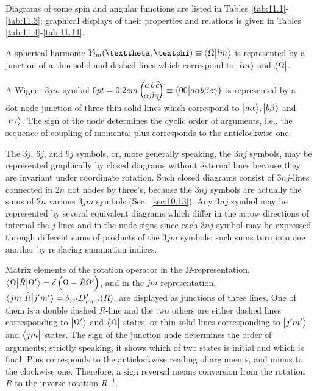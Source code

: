 Diagrams of some spin and angular functions are listed in Tables \ref{tab:11.1}-\ref{tab:11.3}; graphical displays of their properties and relations is given in Tables \ref{tab:11.4}-\ref{tab:11.14}.

A spherical harmonic \(Y_{l m}(\vartheta, \varphi) \equiv\braket{\Omega}{l m}\) is represented by a junction of a thin solid and dashed lines which correspond to \(\bigl| l m \bigr\rangle\) and \(\bigl\langle \Omega \bigr|\).

A Wigner \(3 j m\) symbol \(\threej{a}{b}{c}{\alpha}{\beta}{\gamma} \equiv\rbraket{00}{a \alpha b \beta c \gamma}\) is represented by a dot-node junction of three thin solid lines which correspond to \(\bigl| a \alpha \bigr\rangle, \bigl| b \beta \bigr\rangle\) and \(\bigl| c \gamma \bigr\rangle\). The sign of the node determines the cyclic order of arguments, i.e., the sequence of coupling of momenta: plus corresponds to the anticlockwise one.

The \(3 j\), \(6 j\), and \(9 j\) symbols, or, more generally speaking, the \(3 n j\) symbols, may be represented graphically by closed diagrams without external lines because they are invariant under coordinate rotation. Such closed diagrams consist of \(3 n j\)-lines connected in \(2 n\) dot nodes by three's, because the \(3 n j\) symbols are actually the sums of \(2 n\) various \(3 j m\) symbols (Sec.~\ref{sec:10.13}). Any \(3 n j\) symbol may be represented by several equivalent diagrams which differ in the arrow directions of internal the \(j\) lines and in the node signs since each \(3 n j\) symbol may be expressed through different sums of products of the \(3 jm\) symbols; such sums turn into one another by replacing summation indices.

Matrix elements of the rotation operator in the \(\Omega\)-representation, \(\bigl\langle \Omega \big| \hat{R} \big| \Omega^{\prime} \bigr\rangle=\delta\left(\Omega-\hat{R} \Omega^{\prime}\right)\), and in the \(j m\) representation, \(\bigl\langle j m \big| \widehat{R} \big| j^{\prime} m^{\prime} \bigr\rangle=\delta_{j j^{\prime}} D_{m m^{\prime}}^{j}(R)\), are displayed as junctions of three lines. One of them is a double dashed \(R\)-line and the two others are either dashed lines corresponding to \(\bigl| \Omega^{\prime} \bigr\rangle\) and \(\bigl\langle \Omega \bigr|\) states, or thin solid lines corresponding to \(\bigl| j^{\prime} m^{\prime} \bigr\rangle\) and \(\bigl\langle  j m \bigr|\) states. The sign of the junction node determines the order of arguments; strictly speaking, it shows which of two states is initial and which is final. Plus corresponds to the anticlockwise reading of arguments, and minus to the clockwise one. Therefore, a sign reversal means conversion from the rotation \(R\) to the inverse rotation \(R^{-1}\).

